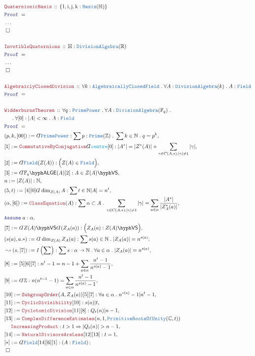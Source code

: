 \documentclass[12pt]{scrartcl}%
\newcommand{\TYPE}[1]{\textcolor{NavyBlue}{\mathtt{#1}}}%
\newcommand{\FUNC}[1]{\textcolor{Cerulean}{\mathtt{#1}}}%
\newcommand{\LOGIC}[1]{\textcolor{Blue}{\mathtt{#1}}}%
\newcommand{\THM}[1]{\textcolor{Maroon}{\mathtt{#1}}}%
\renewcommand{\.}{\; . \;} %
\newcommand{\de}{: \kern 0.1pc =} %
\newcommand{\Theorem}[2]{& \THM{#1} \, :: \, #2 \\ & \Proof = \\ } %
\newcommand{\NewLine}{\\ & \kern 1pc}%
\newcommand{\Page}[1]{ \begin{align*} #1 \end{align*}  }%
\newcommand{ \bd }{ \ByDef }%
\newcommand{\NoProof}{ & \ldots \\ \EndProof}%
\newcommand{\Int}{\mathbb{Z}}%
\newcommand{\Reals}{\mathbb{R}}%
\newcommand{\Complex}{\mathbb{C}}%
\newcommand{\Quat}{\mathbb{H}}%
\newcommand{\Nat}{\mathbb{N}}%
\newcommand{\Say}[3]{& #1 \de #2 : #3, \\} %
\newcommand{\Conclude}[3]{& #1 \de #2 : #3; \\}%
\newcommand{\Derive}[3]{& \leadsto #1 \de #2 : #3, \\} %
\newcommand{\Assume}[2]{& \LOGIC{Assume} \; #1 : #2, \\} %
\newcommand{\QED}{\; \square} %
\newcommand{\EndProof}{& \QED \\} %
\newcommand{\ByDef}{\rotatebox[origin=c]{-180}{$D$}}%
\newcommand{\Proof}{\LOGIC{Proof} \; } %
\newcommand{\VS}[1]{#1\hyph\mathsf{VS}} %
\newcommand{\Field}{\TYPE{Field}}
\newcommand{\ACF}{\TYPE{AlgebraicallyClosedField}}
\newcommand{\LALGE}[1]{#1\hyph\mathsf{ALGE}}%
\begin{document}
\Page{ 
	\Theorem{QuaternionicBasis}{\{1,\mathrm{i,j,k} : \TYPE{Basis}(\Quat)\}}
	\NoProof
	\\
	\Theorem{InvetibleQuaternions}{ \mathbb{H} : \TYPE{DivisionAlgebra}(\Reals)}
	\NoProof
	\\
	\Theorem{AlgebraiclyClosedDivision}{\forall k : \ACF \. \forall A : \TYPE{DivisionAlgebra}(k) \. A : \Field}
	\\
	\Theorem{WidderburnsTheorem}{ \forall q : \TYPE{PrimePower} \. \forall A : \TYPE{DivisionAlgebra}(\mathbb{F}_q) \. \NewLine \. \forall [0] : |A| < \infty \.  A : \Field  }
	\Say{(p,k,[00])}{\bd \TYPE{PrimePower}}{\sum p : \TYPE{Prime}(\Int) \. \sum k \in \Nat \. q = p^k  }
	\Say{[1]}{\THM{CommutativeByConjugation}\bd \FUNC{centre}[0]}{|A^*| = |Z^*(A)| + \sum_{\gamma \in C(A,*) : |\gamma| \neq 1} |\gamma| } 
	\Say{[2]}{ \bd \Field (Z(A))  }{\Big(Z(A) \in \Field \Big)}
	\Say{[3]}{\bd \LALGE{\mathbb{F}_q}(A)[2]}{A \in \VS{Z(A)}}
	\Say{n}{|Z(A)|}{\Nat}
	\Say{(5,t)}{[4][0]\bd \dim_{Z(A)} A}{ \sum t \in \Nat  |A| = n^t  } 
	\Say{(\alpha,[6])}{\THM{ClassEquation}(A)}{ \sum \alpha \subset A \. \sum_{\gamma \in C(A,*) : |\gamma| \neq 1} |\gamma| = \sum_{a \in \alpha} \frac{|A^*|}{|Z_A^*(a)|}  } 
	\Assume{a}{\alpha}
	\Say{[7]}{\bd \VS{Z(A)}\bd (Z_A(a))}{\Big( Z_A(a) : \VS{Z(A)}  \Big)}
	\Conclude{(s(a),a.*)}{\bd \dim_{Z(A)} Z_A(a)}{ \sum s(a) \in \Nat \. |Z_A(a)| = n^{s(a)}   }
	\Derive{(s,[7])}{I\left(\sum\right)}{\sum s : \alpha \to \Nat \. \forall a \in \alpha \. |Z_A(a)| = n^{s(a)}} 
	\Say{[8]}{[5][6][7]}{ n^t - 1 = n - 1 + \sum_{a \in \alpha} \frac{n^t - 1}{n^{s(a)} - 1}}
	\Say{[9]}{ \bd \Int }{  n( n^{t-1} - 1) = \sum_{a \in \alpha} \frac{n^t - 1}{n^{s(a)} - 1 }   } 
	\Say{[10]}{\THM{SubgroupOrder}(A,Z_A(a))[5][7]}{\forall a \in \alpha \. n^{s(a)} - 1 | n^t - 1  }
	\Say{[11]}{\THM{CyclicDivisibility}[10]}{ s(a) | t}
	\Say{[12]}{\THM{CyclotomicDivision}[11][8]}{  Q_t(n) | n - 1   }
	\Say{[13]}{\THM{ComplexDifferenceEstimates}(n,1,\TYPE{PrimitiveRootsOfUnity}(\Complex,t))\NewLine\THM{IncreasingProduct}}{t > 1 \Rightarrow |Q_t(n)| > n - 1}
	\Say{[14]}{\THM{NaturalDivisorsAreLess}[12][13]}{t = 1}
	\Conclude{[*]}{\bd \Field[14][6][1]}{\left( A : \Field \right)}
	\EndProof
}
\end{document}
